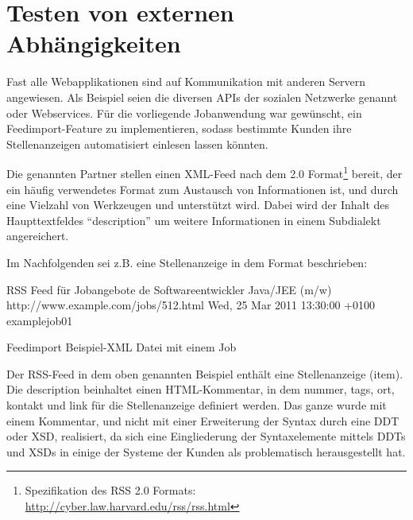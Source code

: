 \section{Testen von externen Abhängigkeiten}
\label{sec:awmock}
Fast alle Webapplikationen sind auf Kommunikation mit anderen Servern angewiesen. Als Beispiel seien die diversen APIs der sozialen Netzwerke genannt oder Webservices. Für die vorliegende Jobanwendung war gewünscht, ein Feedimport-Feature zu implementieren, sodass bestimmte Kunden ihre Stellenanzeigen automatisiert einlesen lassen könnten.

Die genannten Partner stellen einen XML-Feed nach dem  2.0 Format\footnote{Spezifikation des RSS 2.0 Formats: \url{http://cyber.law.harvard.edu/rss/rss.html}} bereit, der ein häufig verwendetes Format zum Austausch von Informationen ist, und durch eine Vielzahl von Werkzeugen und  unterstützt wird.
Dabei wird der Inhalt des Haupttextfeldes "`description"' um weitere Informationen in einem Subdialekt angereichert.

Im Nachfolgenden sei z.B. eine Stellenanzeige in dem Format beschrieben:

\begin{ruby}[label=beispiel\_job.xml, fontsize=\relsize{-2}]
 
    RSS Feed für Jobangebote 
    de
      Softwareentwickler Java/JEE (m/w)
        \PY{c+cp}{<![CDATA[}
\PY{c+cp}{        ]]>}
      http://www.example.com/jobs/512.html
      Wed, 25 Mar 2011 13:30:00 +0100
      example\PYZus{}job\PYZus{}01
\end{ruby}
\captionsetup{type=lstlisting}
\caption{Feedimport Beispiel-XML Datei mit einem Job}
Der RSS-Feed in dem oben genannten Beispiel enthält eine Stellenanzeige (item). Die description beinhaltet einen HTML-Kommentar, in dem nummer, tags, ort, kontakt und link für die Stellenanzeige definiert werden. Das ganze wurde mit einem Kommentar, und nicht mit einer Erweiterung der Syntax durch eine DDT oder XSD, realisiert, da sich eine Eingliederung der Syntaxelemente mittels DDTs und XSDs in einige der Systeme der Kunden als problematisch herausgestellt hat.


